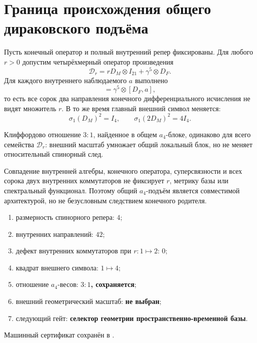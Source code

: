 \chapter{Граница происхождения общего дираковского подъёма}
\label{ch:v8-full-field-a4-dirac-lift-origin-gate}

Пусть конечный оператор и полный внутренний репер фиксированы. Для любого
$r>0$ допустим четырёхмерный оператор произведения
\begin{equation}
 \mathcal D_r=rD_M\otimes I_{21}+\gamma^5\otimes D_F.
 \label{eq:v8-product-dirac-scale-family}
\end{equation}
Для каждого внутреннего наблюдаемого $a$ выполнено
\begin{equation}
 [\mathcal D_r,I_4\otimes a]=\gamma^5\otimes[D_F,a],
 \label{eq:v8-internal-calculus-scale-invariance}
\end{equation}
то есть все сорок два направления конечного дифференциального исчисления не
видят множитель $r$. В то же время главный внешний символ меняется:
\begin{equation}
 \sigma_1(D_M)^2=I_4,
 \qquad \sigma_1(2D_M)^2=4I_4.
 \label{eq:v8-external-symbol-scale-inequivalence}
\end{equation}

\begin{theorem}
Клиффордово отношение $3:1$, найденное в общем $a_4$-блоке, одинаково для
всего семейства $\mathcal D_r$: внешний масштаб умножает общий локальный
блок, но не меняет относительный спинорный след.
\end{theorem}

\begin{nogocriterion}
Совпадение внутренней алгебры, конечного оператора, суперсвязности и всех
сорока двух внутренних коммутаторов не фиксирует $r$, метрику базы или
спектральный функционал. Поэтому общий $a_4$-подъём является совместимой
архитектурой, но не безусловным следствием конечного родителя.
\end{nogocriterion}

\begin{protocol}
\begin{enumerate}
 \item размерность спинорного репера: \textbf{$4$};
 \item внутренних направлений: \textbf{$42$};
 \item дефект внутренних коммутаторов при $r:1\mapsto2$: \textbf{$0$};
 \item квадрат внешнего символа: \textbf{$1\mapsto4$};
 \item отношение $a_4$-весов: \textbf{$3:1$, сохраняется};
 \item внешний геометрический масштаб: \textbf{не выбран};
 \item следующий гейт: \textbf{селектор геометрии пространственно-временной базы}.
\end{enumerate}
\end{protocol}

Машинный сертификат сохранён в
.